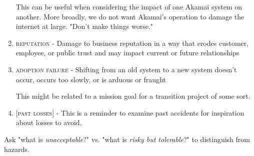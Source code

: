 \documentclass[a4paper]{tufte-book}
\begin{document}
\begin{fullwidth}
\begin{enumerate}
This can be useful when considering the impact of one Akamai system on another.
More broadly, we do not want Akamai's operation to damage the internet at large.
"Don't make things worse."
\item \textsc{reputation} - Damage to business reputation in a way that erodes customer, employee, or public trust and may impact current or future relationships
\item \textsc{adoption failure} - Shifting from an old system to a new system doesn't occur, occurs too slowly, or is arduous or fraught

This might be related to a mission goal for a transition project of some sort.
\item \textsc{[past losses]} - This is a reminder to examine past accidents for inspiration about losses to avoid.
\end{enumerate}  
 

Ask "what is \emph{unacceptable}?" vs. "what is \emph{risky but tolerable}?" to distinguish from hazards.

\end{fullwidth}
\end{document}
